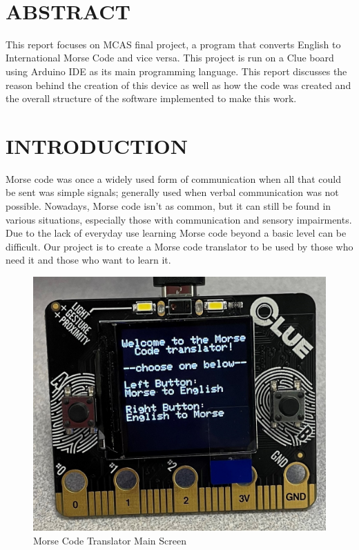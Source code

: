 \documentclass[12pt]{article}
\begin{document}
\begin{titlepage}
\begin{minipage}{0.8\textwidth}
\begin{flushleft}
		\end{flushleft}
	\end{minipage}\\[2 cm]
	
	\vfill
	
\end{titlepage}

\tableofcontents
\pagebreak

\section{ABSTRACT}
This report focuses on MCAS final project, a program that converts English to International Morse Code and vice versa. This project is run on a Clue board using Arduino IDE as its main programming language. This report discusses the reason behind the creation of this device as well as how the code was created and the overall structure of the software implemented to make this work.

\section{INTRODUCTION}
Morse code was once a widely used form of communication when all that could be sent was simple signals; generally used when verbal communication was not possible. Nowadays, Morse code isn't as common, but it can still be found in various situations, especially those with communication and sensory impairments. Due to the lack of everyday use learning Morse code beyond a basic level can be difficult. Our project is to create a Morse code translator to be used by those who need it and those who want to learn it.

\begin{figure}[H]
\centering
\includegraphics[width=4 in]{images/Main Screen.jpg}
\caption{Morse Code Translator Main Screen}
\label{Clueboard_mainmenu}
\end{figure}
\end{document}
